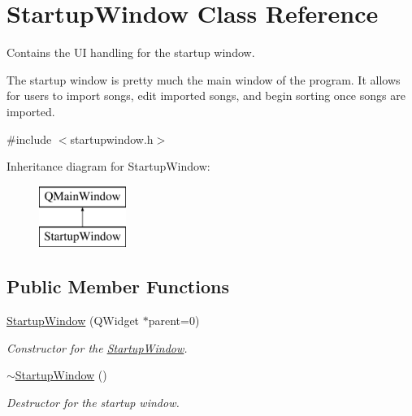 \hypertarget{class_startup_window}{}\section{Startup\+Window Class Reference}
\label{class_startup_window}


Contains the UI handling for the startup window.

The startup window is pretty much the main window of the program. It allows for users to import songs, edit imported songs, and begin sorting once songs are imported.  




{\ttfamily \#include $<$startupwindow.\+h$>$}

Inheritance diagram for Startup\+Window\+:\begin{figure}[H]
\begin{center}
\leavevmode
\includegraphics[height=2.000000cm]{dd/d7e/class_startup_window}
\end{center}
\end{figure}
\subsection*{Public Member Functions}
\begin{DoxyCompactItemize}
\item 
\mbox{\hyperlink{class_startup_window_a5aac41515d35e1306d8ac0890f3de174}{Startup\+Window}} (Q\+Widget $\ast$parent=0)
\begin{DoxyCompactList}\small\item\em Constructor for the \mbox{\hyperlink{class_startup_window}{Startup\+Window}}. \end{DoxyCompactList}\item 
\mbox{\hyperlink{class_startup_window_a770398264202b2b44cf188c6a7b919fd}{$\sim$\+Startup\+Window}} ()
\begin{DoxyCompactList}\small\item\em Destructor for the startup window. \end{DoxyCompactList}\end{DoxyCompactItemize}
